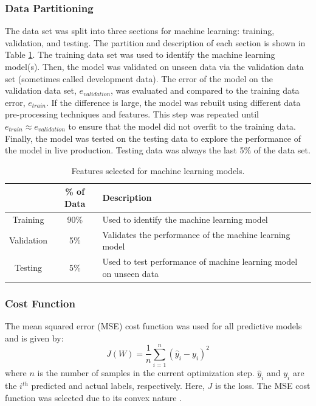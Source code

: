 \subsubsection{Data Partitioning}
The data set was split into three sections for machine learning: training, validation, and testing.  The partition and description of each section is shown in Table \ref{tab:08datapart}. The training data set was used to identify the machine learning model(s).  Then, the model was validated on unseen data via the validation data set (sometimes called development data).  The error of the model on the validation data set, $e_{validation}$, was evaluated and compared to the training data error, $e_{train}$.  If the difference is large, the model was rebuilt using different data pre-processing techniques and features. This step was repeated until $e_{train} \approx e_{validation}$ to ensure that the model did not overfit to the training data. Finally, the model was tested on the testing data to explore the performance of the model in live production.  Testing data was always the last 5\% of the data set.
\begin{table}[h]
    \centering
    {
    \begin{tabular}{ c | c | p{9cm}}
                            & \% of Data        &  Description \\
        \hline
        Training            &  90\%             
        &  Used to identify the machine learning model        \\
        
        Validation          &  5\%              
        &  Validates the performance of the machine learning model         \\
        
        Testing             &  5\%             
        &  Used to test performance of machine learning model on unseen data       \\             
    \end{tabular}}
    \caption{Features selected for machine learning models.}
    \label{tab:08datapart}
\end{table}

\subsubsection{Cost Function}

The mean squared error (MSE) cost function was used for all predictive models and is given by:
\begin{equation}
    J(W) = \frac{1}{n}\sum\limits^n_{i=1}(\hat{y}_i - y_i)^2
    \label{eq:08MSE}
\end{equation}
where $n$ is the number of samples in the current optimization step.  $\hat{y}_i$ and $y_i$ are the $i^{th}$ predicted and actual labels, respectively. Here, $J$ is the loss. The MSE cost function was selected due to its convex nature \cite{deeplearning_course}.

